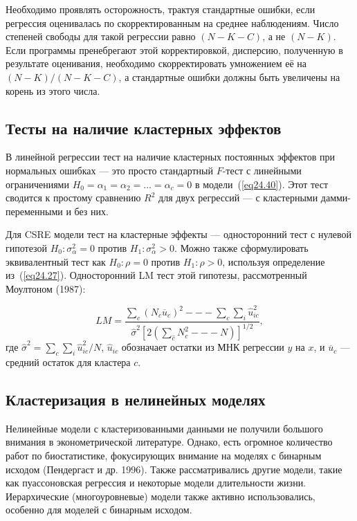 Необходимо проявлять осторожность, трактуя стандартные ошибки, если регрессия оценивалась по скорректированным на среднее наблюдениям. Число степеней свободы для такой регрессии равно $(N-K-C)$, а не $(N-K)$. Если программы пренебрегают этой корректировкой, дисперсию, полученную в результате оценивания, необходимо скорректировать умножением её на $(N-K)/(N-K-C)$, а стандартные ошибки должны быть увеличены на корень из этого числа. 

\subsection{Тесты на наличие кластерных эффектов}

В линейной регрессии тест на наличие кластерных постоянных эффектов при нормальных ошибках --- это просто стандартный $F$-тест с линейными ограничениями $H_0 = \alpha_1 = \alpha_2 = \dots =\alpha_c = 0$ в модели~(\ref{eq24.40}). Этот тест сводится к простому сравнению $R^2$ для двух регрессий --- с кластерными дамми-переменными и без них. 

Для CSRE модели тест на кластерные эффекты --- односторонний тест с нулевой гипотезой $H_0: \sigma^2_{\alpha} = 0$ против $H_1 : \sigma^2_{\alpha} > 0$. Можно также сформулировать эквивалентный тест как $H_0: \rho = 0$ против $H_1 : \rho > 0$, используя определение из~(\ref{eq24.27}). Односторонний LM тест этой гипотезы, рассмотренный Моултоном (1987):

\begin{equation}
\label{eq24.43}
LM = \frac{\sum_c (N_c \overline{u}_c)^2 --- \sum_c \sum_i \hat u_{ic}^2}{\hat \sigma^2 [2(\sum_{\hat c} N_c^2 --- N)]^{1/2}},
\end{equation}
где $\hat \sigma^2 = \sum_c \sum_i \hat u^2_{ic} / N$, $\hat u_{ic}$ обозначает остатки из МНК регрессии $y$ на $x$, и $\overline{u}_c$ --- средний остаток для кластера $c$. 

\subsection{Кластеризация в нелинейных моделях}

Нелинейные модели с кластеризованными данными не получили большого внимания в эконометрической литературе. Однако, есть огромное количество работ по биостатистике, фокусирующих внимание на моделях с бинарным исходом (Пендергаст и др. 1996). Также рассматривались другие модели, такие как пуассоновская регрессия и некоторые модели длительности жизни. Иерархические (многоуровневые) модели также активно использовались, особенно для моделей с бинарным исходом. 

